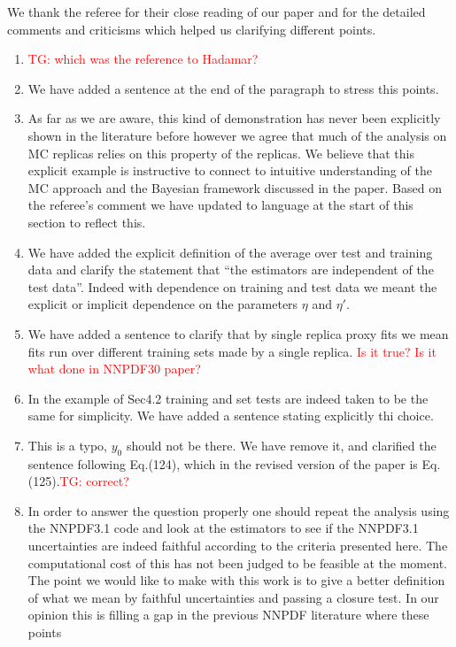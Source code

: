 \documentclass[11pt,a4paper]{article}
\numberwithin{equation}{section}
\numberwithin{figure}{section}
\numberwithin{table}{section}
\begin{document}
We thank the referee for their close reading of our paper and for the detailed comments and criticisms 
which helped us clarifying different points.
\begin{enumerate}
    \item \textcolor{red}{TG: which was the reference to Hadamar?}
    \item We have added a sentence at the end of the paragraph to stress this points.
    \item As far as we are aware, this kind of demonstration has never been explicitly
    shown in the literature before however we agree that much of the analysis on
    MC replicas relies on this property of the replicas. We believe that this explicit example
    is instructive to connect to intuitive understanding of the MC approach and
    the Bayesian framework discussed in the paper. Based on the referee's comment
    we have updated to language at the start of this section to reflect this.
    \item We have added the explicit definition of the average over test and training data and 
    clarify the statement that ``the estimators are independent of the test data''. Indeed with dependence
    on training and test data we meant the explicit or implicit dependence on the parameters $\eta$ and $\eta'$.
    \item We have added a sentence to clarify that by single replica proxy fits we mean fits
    run over different training sets made by a single replica. \textcolor{red}{Is it true? Is it what done in NNPDF30
    paper?}
    \item In the example of Sec4.2 training and set tests are indeed taken to be the same for simplicity.
    We have added a sentence stating explicitly thi choice.
    \item This is a typo, $y_0$ should not be there. We have remove it, and clarified the sentence following Eq.(124),
    which in the revised version of the paper is Eq.(125).\textcolor{red}{TG: correct?}
    \item In order to answer the question properly one should repeat the analysis using the 
    NNPDF3.1 code and look at the estimators to see if the NNPDF3.1 uncertainties are indeed faithful according to 
    the criteria presented here.
    The computational cost of this has not been judged to be feasible at the moment.
    The point we would like to make with this work is to give
    a better definition of what we mean by faithful uncertainties and passing a closure test.
    In our opinion this is filling a gap in the previous NNPDF literature where these points 

\end{enumerate}
\end{document}

